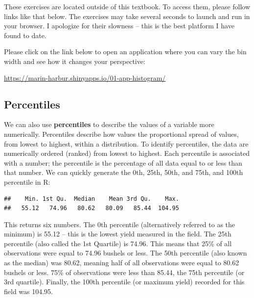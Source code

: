 \documentclass[
]{book}
\newenvironment{Shaded}{\begin{snugshade}}{\end{snugshade}}
\newcommand{\FunctionTok}[1]{\textcolor[rgb]{0.00,0.00,0.00}{#1}}
\newcommand{\NormalTok}[1]{#1}
\newcommand{\SpecialCharTok}[1]{\textcolor[rgb]{0.00,0.00,0.00}{#1}}
\begin{document}
These exercises are located outside of this textbook. To access them,
please follow links like that below. The exercises may take several
seconds to launch and run in your browser. I apologize for their
slowness -- this is the best platform I have found to date.

Please click on the link below to open an application where you can vary
the bin width and see how it changes your perspective:

\url{https://marin-harbur.shinyapps.io/01-app-histogram/}

\hypertarget{percentiles}{%
\subsection{Percentiles}\label{percentiles}}

We can also use \textbf{percentiles} to describe the values of a variable
more numerically. Percentiles describe how values the proportional
spread of values, from lowest to highest, within a distribution. To
identify percentiles, the data are numerically ordered (ranked) from
lowest to highest. Each percentile is associated with a number; the
percentile is the percentage of all data equal to or less than that
number. We can quickly generate the 0th, 25th, 50th, and 75th, and 100th
percentile in R:

\begin{Shaded}
\end{Shaded}

\begin{verbatim}
##    Min. 1st Qu.  Median    Mean 3rd Qu.    Max. 
##   55.12   74.96   80.62   80.09   85.44  104.95
\end{verbatim}

This returns six numbers. The 0th percentile (alternatively referred to
as the minimum) is 55.12 -- this is the lowest yield measured in the
field. The 25th percentile (also called the 1st Quartile) is 74.96. This
means that 25\% of all observations were equal to 74.96 bushels or less.
The 50th percentile (also known as the median) was 80.62, meaning half
of all observations were equal to 80.62 bushels or less. 75\% of
observations were less than 85.44, the 75th percentile (or 3rd
quartile). Finally, the 100th percentile (or maximum yield) recorded for
this field was 104.95.
\end{document}
